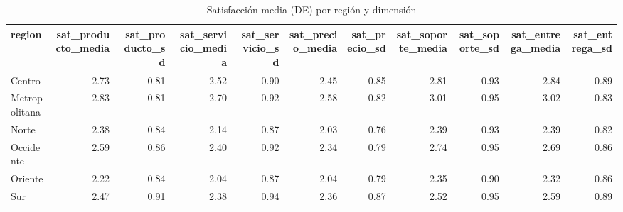 \begin{table}[ht]
\centering
\begin{tabular}{lrrrrrrrrrr}
  \hline
region & sat\_producto\_media & sat\_producto\_sd & sat\_servicio\_media & sat\_servicio\_sd & sat\_precio\_media & sat\_precio\_sd & sat\_soporte\_media & sat\_soporte\_sd & sat\_entrega\_media & sat\_entrega\_sd \\ 
  \hline
Centro & 2.73 & 0.81 & 2.52 & 0.90 & 2.45 & 0.85 & 2.81 & 0.93 & 2.84 & 0.89 \\ 
  Metropolitana & 2.83 & 0.81 & 2.70 & 0.92 & 2.58 & 0.82 & 3.01 & 0.95 & 3.02 & 0.83 \\ 
  Norte & 2.38 & 0.84 & 2.14 & 0.87 & 2.03 & 0.76 & 2.39 & 0.93 & 2.39 & 0.82 \\ 
  Occidente & 2.59 & 0.86 & 2.40 & 0.92 & 2.34 & 0.79 & 2.74 & 0.95 & 2.69 & 0.86 \\ 
  Oriente & 2.22 & 0.84 & 2.04 & 0.87 & 2.04 & 0.79 & 2.35 & 0.90 & 2.32 & 0.86 \\ 
  Sur & 2.47 & 0.91 & 2.38 & 0.94 & 2.36 & 0.87 & 2.52 & 0.95 & 2.59 & 0.89 \\ 
   \hline
\end{tabular}
\caption{Satisfacción media (DE) por región y dimensión} 
\end{table}

